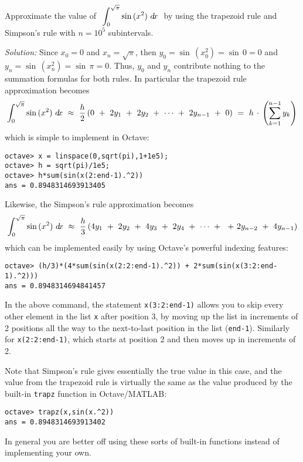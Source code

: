 \newpage
\begin{exmp}\label{exmp:trapsimp}
\noindent Approximate the value of
$~\displaystyle\int_0^{\sqrt{\pi}} \sin\,(x^2)~d\!x~$ by using the trapezoid rule
and Simpson's rule with $n=10^5$ subintervals.\vspace{1mm}
\par\noindent\emph{Solution:} Since $x_0 = 0$ and $x_n = \sqrt{\pi}$, then
$y_0 = \sin\,(x_0^2) = \sin\,0 = 0$ and $y_n = \sin\,(x_n^2) = \sin\,\pi = 0$.
Thus, $y_0$ and $y_n$ contribute nothing to the summation formulas for both
rules. In particular the trapezoid rule approximation becomes
\[
\int_0^{\sqrt{\pi}} \sin\,(x^2)~d\!x ~\approx~
\frac{h}{2}\,(0 ~+~ 2y_1 ~+~ 2y_2 ~+~ \cdots ~+~ 2y_{n-1} ~+~ 0) ~=~
h\,\cdot\,\left(\sum_{k=1}^{n-1} y_k\right)
\]
which is simple to implement in Octave:
\begin{Verbatim}[frame=single, framesep=2mm]
octave> x = linspace(0,sqrt(pi),1+1e5);
octave> h = sqrt(pi)/1e5;
octave> h*sum(sin(x(2:end-1).^2))
ans = 0.8948314693913405
\end{Verbatim}
Likewise, the Simpson's rule approximation becomes
\[
\int_0^{\sqrt{\pi}} \sin\,(x^2)~d\!x ~\approx~
\frac{h}{3}\,(4y_1 ~+~ 2y_2 ~+~  4y_3 ~+~ 2y_4 ~+~ \cdots ~+~
~+~ 2y_{n-2} ~+~ 4y_{n-1})
\]
which can be implemented easily by using Octave's powerful indexing features:
\begin{Verbatim}[frame=single, framesep=2mm]
octave> (h/3)*(4*sum(sin(x(2:2:end-1).^2)) + 2*sum(sin(x(3:2:end-1).^2)))
ans = 0.8948314694841457
\end{Verbatim}
In the above command, the statement \texttt{x(3:2:end-1)} allows you to skip
every other element in the list \texttt{x} after position 3, by moving up
the list in increments of 2 positions all the way to the next-to-last position
in the list (\texttt{end-1}). Similarly for \texttt{x(2:2:end-1)}, which starts
at position 2 and then moves up in increments of 2.

\noindent Note that Simpson's rule gives essentially the true value in this
case, and the value from the trapezoid rule is virtually the same as the value
produced by the built-in \texttt{trapz} function in Octave/MATLAB:
\begin{Verbatim}[frame=single, framesep=2mm]
octave> trapz(x,sin(x.^2))
ans = 0.8948314693913402
\end{Verbatim}
In general you are better off using these sorts of built-in functions instead of
implementing your own.
\end{exmp}\vspace{-2mm}
\divider
\vspace{2mm}

